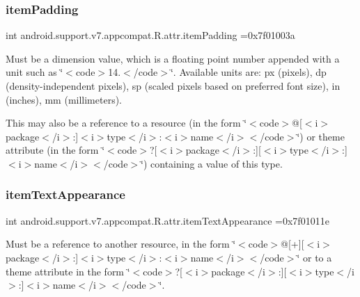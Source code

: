 \subsubsection{\texorpdfstring{item\+Padding}{itemPadding}}
{\footnotesize\ttfamily int android.\+support.\+v7.\+appcompat.\+R.\+attr.\+item\+Padding =0x7f01003a\hspace{0.3cm}{\ttfamily [static]}}

Must be a dimension value, which is a floating point number appended with a unit such as \char`\"{}$<$code$>$14.\+5sp$<$/code$>$\char`\"{}. Available units are\+: px (pixels), dp (density-\/independent pixels), sp (scaled pixels based on preferred font size), in (inches), mm (millimeters). 

This may also be a reference to a resource (in the form \char`\"{}$<$code$>$@\mbox{[}$<$i$>$package$<$/i$>$\+:\mbox{]}$<$i$>$type$<$/i$>$\+:$<$i$>$name$<$/i$>$$<$/code$>$\char`\"{}) or theme attribute (in the form \char`\"{}$<$code$>$?\mbox{[}$<$i$>$package$<$/i$>$\+:\mbox{]}\mbox{[}$<$i$>$type$<$/i$>$\+:\mbox{]}$<$i$>$name$<$/i$>$$<$/code$>$\char`\"{}) containing a value of this type. \mbox{\label{classandroid_1_1support_1_1v7_1_1appcompat_1_1R_1_1attr_a566e6b90192933c84b8d479a1afb59cf}} 
\subsubsection{\texorpdfstring{item\+Text\+Appearance}{itemTextAppearance}}
{\footnotesize\ttfamily int android.\+support.\+v7.\+appcompat.\+R.\+attr.\+item\+Text\+Appearance =0x7f01011e\hspace{0.3cm}{\ttfamily [static]}}

Must be a reference to another resource, in the form \char`\"{}$<$code$>$@\mbox{[}+\mbox{]}\mbox{[}$<$i$>$package$<$/i$>$\+:\mbox{]}$<$i$>$type$<$/i$>$\+:$<$i$>$name$<$/i$>$$<$/code$>$\char`\"{} or to a theme attribute in the form \char`\"{}$<$code$>$?\mbox{[}$<$i$>$package$<$/i$>$\+:\mbox{]}\mbox{[}$<$i$>$type$<$/i$>$\+:\mbox{]}$<$i$>$name$<$/i$>$$<$/code$>$\char`\"{}. \mbox{\label{classandroid_1_1support_1_1v7_1_1appcompat_1_1R_1_1attr_a51093d2dda63df36db5124669cff2ee0}} 
